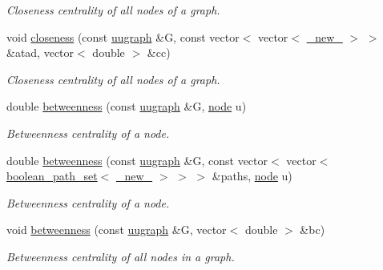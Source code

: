 \begin{DoxyCompactItemize}
\begin{DoxyCompactList}\small\item\em Closeness centrality of all nodes of a graph. \end{DoxyCompactList}\item 
void \hyperlink{namespacelgraph_1_1networks_1_1metrics_1_1centralities_a9774afdefe5a503baa5c600ae8e903c2}{closeness} (const \hyperlink{classlgraph_1_1utils_1_1uugraph}{uugraph} \&G, const vector$<$ vector$<$ \hyperlink{namespacelgraph_1_1utils_a2c84bfde888c42ab3ad6b2cb8a364240}{\+\_\+new\+\_\+} $>$ $>$ \&atad, vector$<$ double $>$ \&cc)
\begin{DoxyCompactList}\small\item\em Closeness centrality of all nodes of a graph. \end{DoxyCompactList}\item 
double \hyperlink{namespacelgraph_1_1networks_1_1metrics_1_1centralities_aa4f1bdbafd5df2de345a6bd7976b4b2f}{betweenness} (const \hyperlink{classlgraph_1_1utils_1_1uugraph}{uugraph} \&G, \hyperlink{namespacelgraph_1_1utils_ab9c6b34241f0b68372c55f34c460e863}{node} u)
\begin{DoxyCompactList}\small\item\em Betweenness centrality of a node. \end{DoxyCompactList}\item 
double \hyperlink{namespacelgraph_1_1networks_1_1metrics_1_1centralities_ab0bbeb70e403b5d262debf80f8d93dc1}{betweenness} (const \hyperlink{classlgraph_1_1utils_1_1uugraph}{uugraph} \&G, const vector$<$ vector$<$ \hyperlink{namespacelgraph_1_1utils_aaf50131e15d771a45620336d6e7a77f8}{boolean\+\_\+path\+\_\+set}$<$ \hyperlink{namespacelgraph_1_1utils_a2c84bfde888c42ab3ad6b2cb8a364240}{\+\_\+new\+\_\+} $>$ $>$ $>$ \&paths, \hyperlink{namespacelgraph_1_1utils_ab9c6b34241f0b68372c55f34c460e863}{node} u)
\begin{DoxyCompactList}\small\item\em Betweenness centrality of a node. \end{DoxyCompactList}\item 
void \hyperlink{namespacelgraph_1_1networks_1_1metrics_1_1centralities_ad5f8fafeefd9a4cdb6ba5da8c33f9b69}{betweenness} (const \hyperlink{classlgraph_1_1utils_1_1uugraph}{uugraph} \&G, vector$<$ double $>$ \&bc)
\begin{DoxyCompactList}\small\item\em Betweenness centrality of all nodes in a graph. \end{DoxyCompactList}\item 

\end{DoxyCompactItemize}
